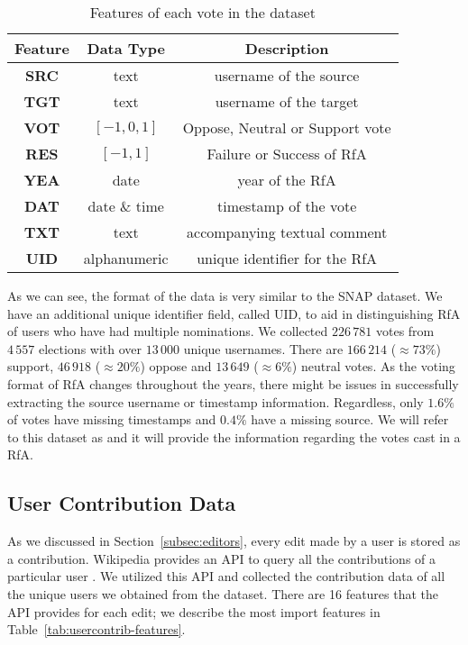 \begin{table}[htp]
    \centering
    \caption{Features of each vote in the \wikirfa dataset}
    \label{tab:wiki-rfa-features}
    \begin{tabular}{ccc}
        \toprule
        Feature & Data Type & Description\\
        \midrule
        \textbf{SRC}&text & username of the source\\
        \textbf{TGT}&text & username of the target\\
        \textbf{VOT}&$[-1,0,1]$& Oppose, Neutral or Support vote\\
        \textbf{RES}&$[-1,1]$ & Failure or Success of RfA\\
        \textbf{YEA}&date & year of the RfA\\
        \textbf{DAT}& date \& time & timestamp of the vote\\
        \textbf{TXT}&text &accompanying textual comment \\
        \textbf{UID}&alphanumeric&  unique identifier for the RfA\\
        \bottomrule
    \end{tabular}
\end{table}
As we can see, the format of the data is very similar to the SNAP dataset.
We have an additional unique identifier field, called UID, to aid in distinguishing RfA of users who have had multiple nominations.
We collected $226\,781$ votes from $4\,557$ elections with over $13\,000$ unique usernames. There are $166\,214$ ($\approx 73\%$) support, $46\,918$ ($\approx 20\%$) oppose and $13\,649$ ($\approx 6\%$) neutral votes.
As the voting format of RfA changes throughout the years, there might be issues in successfully extracting the source username or timestamp information. 
Regardless, only $1.6\%$ of votes have missing timestamps and $0.4\%$ have a missing source.
We will refer to this dataset as \wikirfa and it will provide the information regarding the votes cast in a RfA.

\subsection{User Contribution Data}
As we discussed in Section~\ref{subsec:editors}, every edit made by a user is stored as a contribution.
Wikipedia provides an API to query all the contributions of a particular user \cite{wiki:Usercontribs-api}.  
We utilized this API and collected the contribution data of all the unique users we obtained from the \wikirfa dataset.
There are 16 features that the API provides for each edit; we describe the most import features in Table~\ref{tab:usercontrib-features}.


